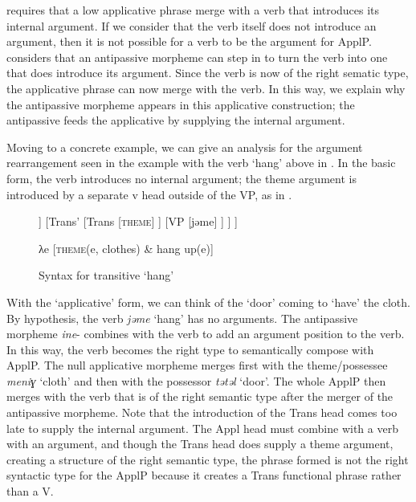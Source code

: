 \documentclass[output=paper,modfonts,nonflat,newtxmath]{langsci/langscibook}
\begin{document}
\citet{Pyllkänen2008} requires that a low applicative phrase merge with a verb that introduces its internal argument. If we consider that the verb itself does not introduce an argument, then it is not possible for a verb to be the argument for ApplP. \citet{Basilico2017} considers that an antipassive morpheme can step in to turn the verb into one that does introduce its argument. Since the verb is now of the right sematic type, the applicative phrase can now merge with the verb. In this way, we explain why the antipassive morpheme appears in this applicative construction; the antipassive feeds the applicative by supplying the internal argument.

Moving to a concrete example, we can give an analysis for the argument rearrangement seen in the example with the verb ‘hang’ above in . In the basic form, the verb introduces no internal argument; the theme argument is introduced by a separate v head outside of the VP, as in .

\begin{figure}
	\begin{forest}
			[TransP
				[NP 
					[ewirɁ-ǝ-t]
				]
				[Trans'
					[Trans
						[\textsc{theme}]
					]
					[VP
						[jǝme]
					]
				]
			]
	\end{forest}

λe [\textsc{theme}(e, clothes) \& hang up(e)]
	\caption{\label{fig:basilico:8} Syntax for transitive ‘hang’}
\end{figure}  


           

With the ‘applicative’ form, we can think of the ‘door’ coming to ‘have’ the cloth. By hypothesis, the verb \textit{jǝme} ‘hang’ has no arguments. The antipassive morpheme \textit{ine}{}- combines with the verb to add an argument position to the verb. In this way, the verb becomes the right type to semantically compose with ApplP. The null applicative morpheme merges first with the theme/possessee \textit{meniɣ} ‘cloth’ and then with the possessor \textit{tǝtǝl} ‘door’. The whole ApplP then merges with the verb that is of the right semantic type after the merger of the antipassive morpheme. Note that the introduction of the Trans head comes too late to supply the internal argument. The Appl head must combine with a verb with an argument, and though the Trans head does supply a theme argument, creating a structure of the right semantic type, the phrase formed is not the right syntactic type for the ApplP because it creates a Trans functional phrase rather than a V.
\end{document}
